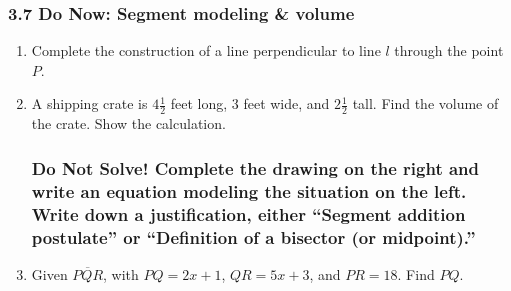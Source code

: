 \documentclass[12pt, twoside]{article}
\begin{document}
\subsubsection*{3.7 Do Now: Segment modeling \& volume}
  \begin{enumerate}

  \item Complete the construction of a line perpendicular to line $l$ through the point $P$. 
  \vspace{4cm}
    \begin{center}
    \end{center} \vspace{4cm}
  
  \item  A shipping crate is $4 \frac{1}{2}$ feet long, 3 feet wide, and $2 \frac{1}{2}$ tall. Find the volume of the crate. Show the calculation.
  \begin{flushright}
    \end{flushright} \vspace{2cm}

    \newpage
    \subsubsection*{Do Not Solve! Complete the drawing on the right and write an equation modeling the situation on the left. Write down a justification, either ``Segment addition postulate'' or ``Definition of a bisector (or midpoint).''}
    \vspace{0.5cm}
  
  \item Given $\overline{PQR}$, with $PQ=2x+1$, $QR=5x+3$, and $PR=18$. Find ${PQ}$. \vspace{1cm}
  \begin{flushright}
    \end{flushright} \vspace{2cm}
  

\end{enumerate}
\end{document}
